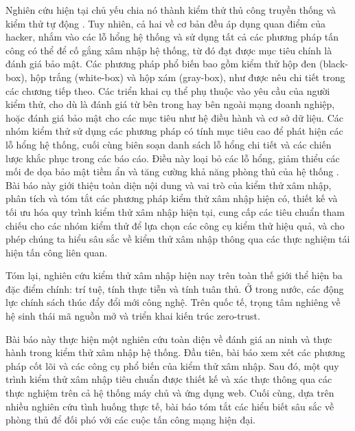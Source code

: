 \documentclass[conference]{IEEEtran}
\begin{document}
Nghiên cứu hiện tại chủ yếu chia nó thành kiểm thử thủ công truyền thống và kiểm thử tự động \cite{ref8}. Tuy nhiên, cả hai về cơ bản đều áp dụng quan điểm của hacker, nhắm vào các lỗ hổng hệ thống và sử dụng tất cả các phương pháp tấn công có thể để cố gắng xâm nhập hệ thống, từ đó đạt được mục tiêu chính là đánh giá bảo mật. Các phương pháp phổ biến bao gồm kiểm thử hộp đen (black-box), hộp trắng (white-box) và hộp xám (gray-box), như được nêu chi tiết trong các chương tiếp theo. Các triển khai cụ thể phụ thuộc vào yêu cầu của người kiểm thử, cho dù là đánh giá từ bên trong hay bên ngoài mạng doanh nghiệp, hoặc đánh giá bảo mật cho các mục tiêu như hệ điều hành và cơ sở dữ liệu. Các nhóm kiểm thử sử dụng các phương pháp có tính mục tiêu cao để phát hiện các lỗ hổng hệ thống, cuối cùng biên soạn danh sách lỗ hổng chi tiết và các chiến lược khắc phục trong các báo cáo. Điều này loại bỏ các lỗ hổng, giảm thiểu các mối đe dọa bảo mật tiềm ẩn và tăng cường khả năng phòng thủ của hệ thống \cite{ref6}. Bài báo này giới thiệu toàn diện nội dung và vai trò của kiểm thử xâm nhập, phân tích và tóm tắt các phương pháp kiểm thử xâm nhập hiện có, thiết kế và tối ưu hóa quy trình kiểm thử xâm nhập hiện tại, cung cấp các tiêu chuẩn tham chiếu cho các nhóm kiểm thử để lựa chọn các công cụ kiểm thử hiệu quả, và cho phép chúng ta hiểu sâu sắc về kiểm thử xâm nhập thông qua các thực nghiệm tái hiện tấn công liên quan.

Tóm lại, nghiên cứu kiểm thử xâm nhập hiện nay trên toàn thế giới thể hiện ba đặc điểm chính: trí tuệ, tính thực tiễn và tính tuân thủ. Ở trong nước, các động lực chính sách thúc đẩy đổi mới công nghệ. Trên quốc tế, trọng tâm nghiêng về hệ sinh thái mã nguồn mở và triển khai kiến trúc zero-trust.

Bài báo này thực hiện một nghiên cứu toàn diện về đánh giá an ninh và thực hành trong kiểm thử xâm nhập hệ thống. Đầu tiên, bài báo xem xét các phương pháp cốt lõi và các công cụ phổ biến của kiểm thử xâm nhập. Sau đó, một quy trình kiểm thử xâm nhập tiêu chuẩn được thiết kế và xác thực thông qua các thực nghiệm trên cả hệ thống máy chủ và ứng dụng web. Cuối cùng, dựa trên nhiều nghiên cứu tình huống thực tế, bài báo tóm tắt các hiểu biết sâu sắc về phòng thủ để đối phó với các cuộc tấn công mạng hiện đại.
\end{document}
